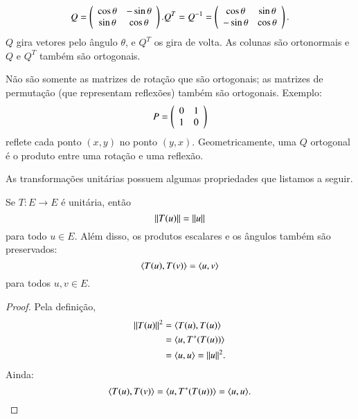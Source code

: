 \begin{exemplo}
  \begin{equation*}
    Q = \left(
      \begin{array}{c c}
        \cos{\theta} & -\sin{\theta}\\
        \sin{\theta} & \cos{\theta}
      \end{array}
    \right). Q^T = Q^{-1} = \left(
      \begin{array}{c c}
        \cos{\theta} & \sin{\theta}\\
        -\sin{\theta} & \cos{\theta}
      \end{array}
    \right).
  \end{equation*}
  $Q$ gira vetores pelo ângulo $\theta$, e $Q^T$ os gira de volta. As colunas são ortonormais e $Q$ e $Q^T$ também são ortogonais.
\end{exemplo}

\begin{exemplo}
  Não são somente as matrizes de rotação que são ortogonais; as matrizes de permutação (que representam reflexões) também são ortogonais. Exemplo:
  \begin{equation*}
    P = \left(
      \begin{array}{c c}
        0 & 1\\
        1 & 0
      \end{array}
    \right)
  \end{equation*}
  reflete cada ponto $(x,y)$ no ponto $(y,x)$. Geometricamente, uma $Q$ ortogonal é o produto entre uma rotação e uma reflexão.
\end{exemplo}

As transformações unitárias possuem algumas propriedades que listamos a seguir.

\begin{teo}
	Se $T:E\to E$ é unitária, então
	\begin{equation*}
    	\| T(u) \| = \| u \|
    \end{equation*}
    para todo $u\in E$. Além disso, os produtos escalares e os ângulos também são preservados:
    \begin{equation*}
    	\langle T(u), T(v) \rangle = \langle u, v \rangle
    \end{equation*}
    para todos $u,v\in E$.
\end{teo}
\begin{proof}
Pela definição,
\begin{align*}
\| T(u) \|^2 &= \langle T(u), T(u) \rangle\\
	& = \langle u, T^*(T(u)) \rangle\\ 
    & = \langle u, u \rangle = \| u \|^2.
\end{align*}
Ainda:
\begin{equation*}
\langle T(u), T(v) \rangle  = \langle u, T^*(T(u)) \rangle = \langle u, u \rangle.
\end{equation*}
\end{proof}


